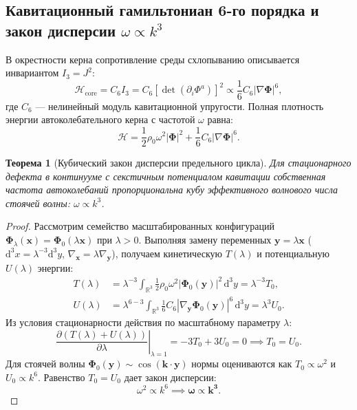 \documentclass[11pt,a4paper]{article}
\newtheorem{theorem}{Теорема}[section]
\theoremstyle{definition}
\theoremstyle{remark}
\begin{document}
\subsection{Кавитационный гамильтониан 6-го порядка и закон дисперсии $\omega \propto k^3$}
В окрестности керна сопротивление среды схлопыванию описывается инвариантом $I_3 = J^2$:
\begin{equation}
    \mathcal{H}_{\mathrm{core}} = C_6 I_3 = C_6 \left[ \det\left(\partial_i \Phi^a\right) \right]^2 \propto \frac{1}{6} C_6 |\nabla \boldsymbol{\Phi}|^6,
\end{equation}
где $C_6$ --- нелинейный модуль кавитационной упругости. Полная плотность энергии автоколебательного керна с частотой $\omega$ равна:
\begin{equation}
    \mathcal{H} = \frac{1}{2} \rho_0 \omega^2 |\boldsymbol{\Phi}|^2 + \frac{1}{6} C_6 |\nabla \boldsymbol{\Phi}|^6.
\end{equation}

\begin{theorem}[Кубический закон дисперсии предельного цикла]
Для стационарного дефекта в континууме с секстичным потенциалом кавитации собственная частота автоколебаний пропорциональна кубу эффективного волнового числа стоячей волны: $\omega \propto k^3$.
\end{theorem}

\begin{proof}
Рассмотрим семейство масштабированных конфигураций $\boldsymbol{\Phi}_\lambda(\mathbf{x}) = \boldsymbol{\Phi}_0(\lambda \mathbf{x})$ при $\lambda > 0$. Выполняя замену переменных $\mathbf{y} = \lambda \mathbf{x}$ ($\mathrm{d}^3 x = \lambda^{-3} \mathrm{d}^3 y$, $\nabla_\mathbf{x} = \lambda \nabla_\mathbf{y}$), получаем кинетическую $T(\lambda)$ и потенциальную $U(\lambda)$ энергии:
\begin{align}
    T(\lambda) &= \lambda^{-3} \int_{\mathbb{R}^3} \frac{1}{2} \rho_0 \omega^2 |\boldsymbol{\Phi}_0(\mathbf{y})|^2 \, \mathrm{d}^3 y = \lambda^{-3} T_0, \\
    U(\lambda) &= \lambda^{6 - 3} \int_{\mathbb{R}^3} \frac{1}{6} C_6 |\nabla_\mathbf{y} \boldsymbol{\Phi}_0(\mathbf{y})|^6 \, \mathrm{d}^3 y = \lambda^3 U_0.
\end{align}
Из условия стационарности действия по масштабному параметру $\lambda$:
\begin{equation}
    \left. \frac{\partial (T(\lambda) + U(\lambda))}{\partial \lambda} \right|_{\lambda=1} = -3 T_0 + 3 U_0 = 0 \implies T_0 = U_0.
\end{equation}
Для стоячей волны $\boldsymbol{\Phi}_0(\mathbf{y}) \sim \cos(\mathbf{k} \cdot \mathbf{y})$ нормы оцениваются как $T_0 \propto \omega^2$ и $U_0 \propto k^6$. Равенство $T_0 = U_0$ дает закон дисперсии:
\begin{equation}
    \omega^2 \propto k^6 \implies \boldsymbol{\omega \propto k^3}.
\end{equation}
\end{proof}
\end{document}
